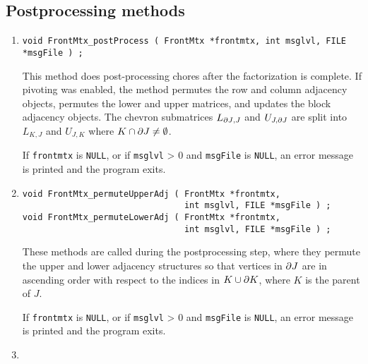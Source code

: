 \subsection{Postprocessing methods}
\label{subsection:FrontMtx:proto:postprocess}
\par
\begin{enumerate}
\item
\begin{verbatim}
void FrontMtx_postProcess ( FrontMtx *frontmtx, int msglvl, FILE *msgFile ) ;
\end{verbatim}
This method does post-processing chores after the factorization is
complete.
If pivoting was enabled, the method
permutes the row and column adjacency objects,
permutes the lower and upper matrices,
and updates the block adjacency objects.
The chevron submatrices $L_{{\partial{J}},J}$ and $U_{J,{\partial{J}}}$
are split into $L_{K,J}$ and $U_{J,K}$ 
where $K \cap {\partial{J}} \ne \emptyset$.
\par {}
If {\tt frontmtx} is {\tt NULL},
or if {\tt msglvl} > 0 and {\tt msgFile} is {\tt NULL}, 
an error message is printed and the program exits.
\item
\begin{verbatim}
void FrontMtx_permuteUpperAdj ( FrontMtx *frontmtx, 
                                int msglvl, FILE *msgFile ) ;
void FrontMtx_permuteLowerAdj ( FrontMtx *frontmtx, 
                                int msglvl, FILE *msgFile ) ;
\end{verbatim}
These methods are called during the postprocessing step, 
where they permute the upper and lower adjacency structures so that
vertices in ${\partial{J}}$ are in ascending order with respect to the
indices in $K \cup {\partial{K}}$, where $K$ is the parent of $J$.
\par {}
If {\tt frontmtx} is {\tt NULL},
or if {\tt msglvl} > 0 and {\tt msgFile} is {\tt NULL}, 
an error message is printed and the program exits.
\item
\begin{verbatim}

\end{verbatim}
\end{enumerate}
